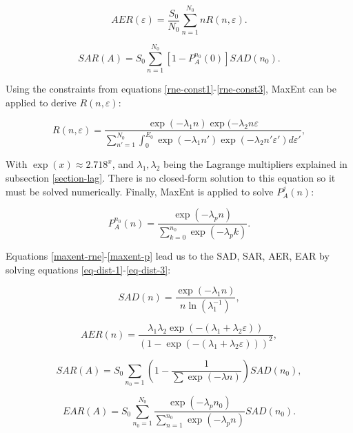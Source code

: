\documentclass[letterpaper,12pt]{article}
\begin{document}
\begin{equation}\label{eq-dist-2}
  AER(\varepsilon) = \frac{S_0}{N_0}\sum_{n = 1}^{N_0} nR(n, \varepsilon).
\end{equation}

\begin{equation}\label{eq-dist-3}
  SAR(A) = S_0\sum_{n = 1}^{N_0}\left[1 - P_A^{n_0}(0)\right]SAD(n_0).
\end{equation}

Using the constraints from equations \ref{rne-const1}-\ref{rne-const3}, MaxEnt
can be applied to derive $R(n, \varepsilon)$:

\begin{equation}\label{maxent-rne}
  R(n, \varepsilon) = \frac{\exp(-\lambda_1n)\exp(-\lambda_2n\varepsilon}{\sum_{n' = 1}^{N_0} \int_0^{E_0} \exp(-\lambda_1n')\exp(-\lambda_2n'\varepsilon')d\varepsilon'},
\end{equation}

With $\exp(x) \approx 2.718^x$, and $\lambda_1, \lambda_2$ being the
Lagrange multipliers explained in subsection \ref{section-lag}. There is no
closed-form solution to this equation so it must be solved numerically. Finally,
MaxEnt is applied to solve $P_A^{j}(n)$:

\begin{equation}\label{maxent-p}
  P^{n_0}_A(n) = \frac{\exp(-\lambda_pn)}{\sum_{k=0}^{n_0}\exp(-\lambda_pk)}.
\end{equation}

Equations \ref{maxent-rne}-\ref{maxent-p} lead us to the SAD, SAR, AER, EAR by solving
equations \ref{eq-dist-1}-\ref{eq-dist-3}:

\begin{equation}
  SAD(n) = \frac{\exp(-\lambda_{1}n)}{n\ln(\lambda_{1}^{-1})},
\end{equation}

\begin{equation}
  AER(n) = \frac{\lambda_{1}\lambda_{2}\exp(-(\lambda_{1} + \lambda_{2}\varepsilon))}{\left(1 - \exp(-(\lambda_{1} + \lambda_{2}\varepsilon))\right)^2},
\end{equation}

\begin{equation}
  SAR(A) = S_{0}\sum_{n_{0} = 1}\left(1 - \frac{1}{\sum \exp(-\lambda n)}\right)SAD(n_{0}),
\end{equation}

\begin{equation}
  EAR(A) = S_{0}\sum_{n_0= 1}^{N_0} \frac{\exp(-\lambda_pn_0)}{\sum_{n=1}^{n_0}\exp(-\lambda_pn)}SAD(n_0).
\end{equation}
\end{document}
